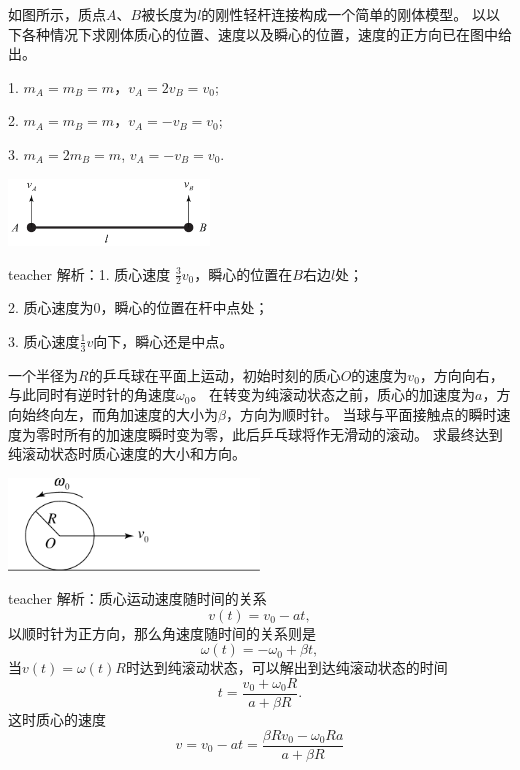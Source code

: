 \begin{example}

如图所示，质点$A$、$B$被长度为$l$的刚性轻杆连接构成一个简单的刚体模型。
以以下各种情况下求刚体质心的位置、速度以及瞬心的位置，速度的正方向已在图中给出。

1. $m_A = m_B=m$，$v_A = 2v_B=v_0$;

2.  $m_A = m_B=m$，$v_A = -v_B=v_0$;

3. $m_A = 2m_B=m$, $v_A = -v_B=v_0$.

\begin{flushright}
\includegraphics[width = 0.4\textwidth]{images/motion-51.pdf} 
\end{flushright}
\begin{taggedblock}{teacher}
\noindent
解析：1. 质心速度 $\frac{3}{2}v_0$，瞬心的位置在$B$右边$l$处；

2. 质心速度为0，瞬心的位置在杆中点处；

3. 质心速度$\frac{1}{3}v$向下，瞬心还是中点。
\end{taggedblock}
\end{example}





\begin{example}
一个半径为$R$的乒乓球在平面上运动，初始时刻的质心$O$的速度为$v_0$，方向向右，与此同时有逆时针的角速度$\omega_0$。
在转变为纯滚动状态之前，质心的加速度为$a$，方向始终向左，而角加速度的大小为$\beta$，方向为顺时针。
当球与平面接触点的瞬时速度为零时所有的加速度瞬时变为零，此后乒乓球将作无滑动的滚动。
求最终达到纯滚动状态时质心速度的大小和方向。
\begin{flushright}
\includegraphics[width=0.5\textwidth]{images/motion-problem-43.pdf}
\end{flushright}
\begin{taggedblock}{teacher}
\noindent
解析：质心运动速度随时间的关系
\[v(t) = v_0-at,\]
以顺时针为正方向，那么角速度随时间的关系则是
\[
\omega(t) = -\omega_0+\beta t,
\]
当$v(t) = \omega(t)R$时达到纯滚动状态，可以解出到达纯滚动状态的时间
\[
t = \frac{v_0+\omega_0R}{a+\beta R}.
\]
这时质心的速度
\[
v = v_0-at = \frac{\beta Rv_0-\omega_0Ra}{a+\beta R}
\]
\end{taggedblock}
\end{example}


